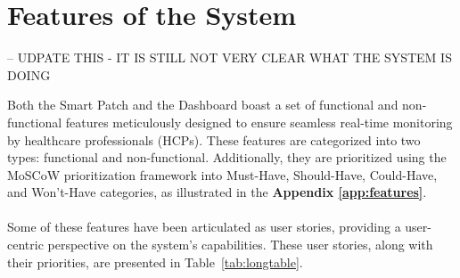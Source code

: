 \section{Features of the System} -- UDPATE THIS - IT IS STILL NOT VERY CLEAR WHAT THE SYSTEM IS DOING

Both the Smart Patch and the Dashboard boast a set of functional and non-functional features meticulously designed to ensure seamless real-time monitoring by healthcare professionals (HCPs). These features are categorized into two types: functional and non-functional. Additionally, they are prioritized using the MoSCoW prioritization framework into Must-Have, Should-Have, Could-Have, and Won’t-Have categories, as illustrated in the \textbf{Appendix \ref{app:features}}. \\ \\
Some of these features have been articulated as user stories, providing a user-centric perspective on the system's capabilities. These user stories, along with their priorities, are presented in Table~\ref{tab:longtable}.

